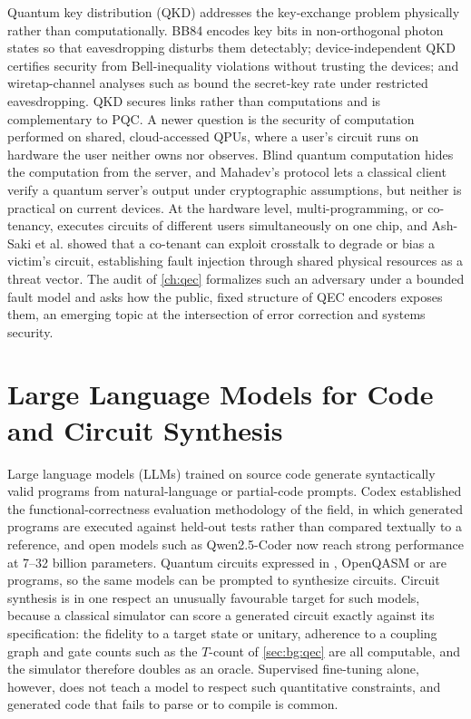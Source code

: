 Quantum key distribution (QKD) addresses the key-exchange problem physically rather than computationally. BB84 \cite{bennett1984bb84} encodes key bits in non-orthogonal photon states so that eavesdropping disturbs them detectably; device-independent QKD \cite{vazirani2014diqkd} certifies security from Bell-inequality violations without trusting the devices; and wiretap-channel analyses such as \cite{pan2020secretkey} bound the secret-key rate under restricted eavesdropping. QKD secures links rather than computations and is complementary to PQC. A newer question is the security of computation performed on shared, cloud-accessed QPUs, where a user's circuit runs on hardware the user neither owns nor observes. Blind quantum computation \cite{broadbent2009blind} hides the computation from the server, and Mahadev's protocol \cite{mahadev2018verification} lets a classical client verify a quantum server's output under cryptographic assumptions, but neither is practical on current devices. At the hardware level, multi-programming, or co-tenancy, executes circuits of different users simultaneously on one chip, and Ash-Saki et al. \cite{ashsaki2020crosstalk} showed that a co-tenant can exploit crosstalk to degrade or bias a victim's circuit, establishing fault injection through shared physical resources as a threat vector. The audit of \cref{ch:qec} \cite{guo2026qecaudit} formalizes such an adversary under a bounded fault model and asks how the public, fixed structure of QEC encoders exposes them, an emerging topic at the intersection of error correction and systems security.

\section{Large Language Models for Code and Circuit Synthesis}\label{sec:bg:llm}

Large language models (LLMs) trained on source code generate syntactically valid programs from natural-language or partial-code prompts. Codex \cite{chen2021codex} established the functional-correctness evaluation methodology of the field, in which generated programs are executed against held-out tests rather than compared textually to a reference, and open models such as Qwen2.5-Coder \cite{hui2024qwen25coder} now reach strong performance at 7--32 billion parameters. Quantum circuits expressed in \qiskit{}, OpenQASM or \cudaq{} are programs, so the same models can be prompted to synthesize circuits. Circuit synthesis is in one respect an unusually favourable target for such models, because a classical simulator can score a generated circuit exactly against its specification: the fidelity to a target state or unitary, adherence to a coupling graph and gate counts such as the $T$-count of \cref{sec:bg:qec} are all computable, and the simulator therefore doubles as an oracle. Supervised fine-tuning alone, however, does not teach a model to respect such quantitative constraints, and generated code that fails to parse or to compile is common.

